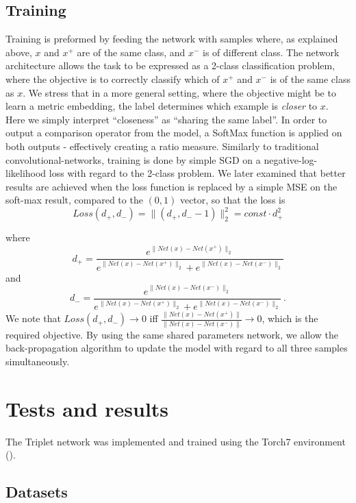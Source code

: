 \documentclass{article} %
\begin{document}
\subsection{Training}
Training is preformed by feeding the network with samples where, as explained above, $x$ and $x^{+}$ are of the same class, and $x^{-}$ is of different class.
The network architecture allows the task to be expressed as a 2-class classification problem, where the objective is to correctly classify  which of $x^+$ and $x^-$ is of the same class as $x$.
We stress that in a more general setting, where the objective might be to learn a metric embedding, 
the label determines which example is  \emph{closer} to $x$.
Here we simply interpret ``closeness'' as ``sharing the same label''.
In order to output a comparison operator from the model,
a SoftMax function is applied on both outputs - effectively creating a ratio measure.
Similarly to traditional convolutional-networks, training is done by simple SGD on a negative-log-likelihood loss with regard to the 2-class problem.
We later examined that better results are achieved when the loss function is replaced by a simple MSE on the soft-max result, compared to the $(0,1)$ vector, so that the loss is 
$$Loss(d_{+},d_{-}) = \|(d_{+} , d_{-}-1)\|_2^2 = const\cdot d_+^2$$

where
$$ d_{+} = \frac{e^{\|Net(x)-Net(x^{+})\|_2}}{e^{\|Net(x)-Net(x^{+})\|_2}+e^{\|Net(x)-Net(x^{-})\|_2}}$$
and
$$ d_{-} = \frac{e^{\|Net(x)-Net(x^{-})\|_2}}{e^{\|Net(x)-Net(x^{+})\|_2}+e^{\|Net(x)-Net(x^{-})\|_2}}\ .$$
We note that $Loss(d_{+},d_{-})  \to 0$ iff $\frac{\|Net(x)-Net(x^{+})\|}{\|Net(x)-Net(x^{-})\|} \to 0$, which is the required objective. 
By using the same shared parameters network, we allow the back-propagation algorithm to update the model with regard to all three samples simultaneously.

\section{Tests and results}
 The Triplet network was implemented and trained using the Torch7 environment (\citet{collobert2011torch7}).
\subsection{Datasets}
\end{document}
